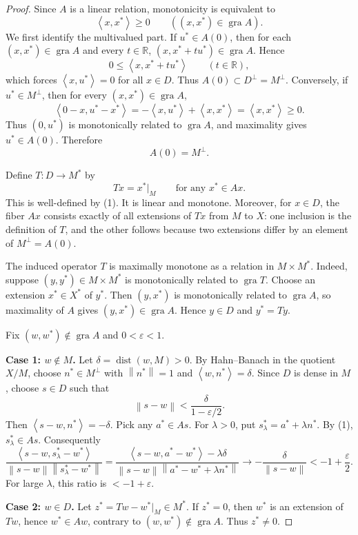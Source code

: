 \documentclass[11pt]{article}
\newcommand{\R}{\mathbb R}
\newcommand{\eps}{\varepsilon}
\newcommand{\gra}{\operatorname{gra}}
\newcommand{\dist}{\operatorname{dist}}
\newcommand{\norm}[1]{\left\lVert #1\right\rVert}
\newcommand{\ip}[2]{\left\langle #1,#2\right\rangle}
\newcommand{\restr}[1]{\big|_{#1}}
\begin{document}
\begin{proof}
Since \(A\) is a linear relation, monotonicity is equivalent to
\[
\ip{x}{x^*}\ge 0\qquad ((x,x^*)\in \gra A).
\]
We first identify the multivalued part. If \(u^*\in A(0)\), then for
each \((x,x^*)\in\gra A\) and every \(t\in\R\),
\((x,x^*+tu^*)\in\gra A\). Hence
\[
0\le \ip{x}{x^*+tu^*}\qquad(t\in\R),
\]
which forces \(\ip{x}{u^*}=0\) for all \(x\in D\). Thus
\(A(0)\subset D^\perp=M^\perp\). Conversely, if \(u^*\in M^\perp\), then
for every \((x,x^*)\in\gra A\),
\[
\ip{0-x}{u^*-x^*}
=-\ip{x}{u^*}+\ip{x}{x^*}
=\ip{x}{x^*}\ge 0.
\]
Thus \((0,u^*)\) is monotonically related to \(\gra A\), and maximality
gives \(u^*\in A(0)\). Therefore
\[
A(0)=M^\perp. \tag{1}
\]

Define \(T:D\to M^*\) by
\[
T x=x^*\restr M\qquad\text{for any }x^*\in A x.
\]
This is well-defined by (1). It is linear and monotone. Moreover, for
\(x\in D\), the fiber \(Ax\) consists exactly of all extensions of
\(Tx\) from \(M\) to \(X\): one inclusion is the definition of \(T\), and
the other follows because two extensions differ by an element of
\(M^\perp=A(0)\).

The induced operator \(T\) is maximally monotone as a relation in
\(M\times M^*\). Indeed, suppose \((y,y^*)\in M\times M^*\) is
monotonically related to \(\gra T\). Choose an extension
\(x^*\in X^*\) of \(y^*\). Then \((y,x^*)\) is monotonically related to
\(\gra A\), so maximality of \(A\) gives \((y,x^*)\in\gra A\). Hence
\(y\in D\) and \(y^*=Ty\).

Fix \((w,w^*)\notin\gra A\) and \(0<\eps<1\).

\medskip
\noindent\textbf{Case 1: \(w\notin M\).}
Let \(\delta=\dist(w,M)>0\). By Hahn--Banach in the quotient \(X/M\),
choose \(n^*\in M^\perp\) with \(\norm{n^*}=1\) and
\(\ip{w}{n^*}=\delta\). Since \(D\) is dense in \(M\), choose \(s\in D\)
such that
\[
\norm{s-w}<\frac{\delta}{1-\eps/2}.
\]
Then \(\ip{s-w}{n^*}=-\delta\). Pick any \(a^*\in A s\). For
\(\lambda>0\), put \(s^*_\lambda=a^*+\lambda n^*\). By (1),
\(s^*_\lambda\in A s\). Consequently
\[
\frac{\ip{s-w}{s^*_\lambda-w^*}}
{\norm{s-w}\norm{s^*_\lambda-w^*}}
=
\frac{\ip{s-w}{a^*-w^*}-\lambda\delta}
{\norm{s-w}\norm{a^*-w^*+\lambda n^*}}
\longrightarrow
-\frac{\delta}{\norm{s-w}}
<-1+\frac{\eps}{2}.
\]
For large \(\lambda\), this ratio is \(<-1+\eps\).

\medskip
\noindent\textbf{Case 2: \(w\in D\).}
Let \(z^*=Tw-w^*\restr M\in M^*\). If \(z^*=0\), then \(w^*\) is an
extension of \(Tw\), hence \(w^*\in Aw\), contrary to
\((w,w^*)\notin\gra A\). Thus \(z^*\ne0\).


\end{proof}
\end{document}
